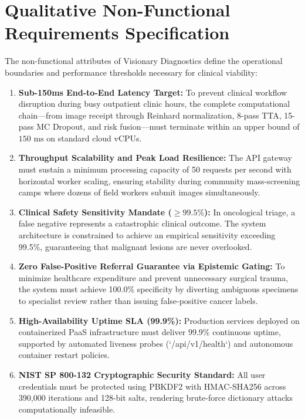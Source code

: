 \documentclass[12pt,a4paper,oneside]{report}
\begin{document}
\section{Qualitative Non-Functional Requirements Specification}
\label{sec:non_functional_reqs}

The non-functional attributes of Visionary Diagnostics define the operational boundaries and performance thresholds necessary for clinical viability:

\begin{enumerate}[label=\textbf{NFR-\arabic*:}]
    \item \textbf{Sub-150ms End-to-End Latency Target:} To prevent clinical workflow disruption during busy outpatient clinic hours, the complete computational chain---from image receipt through Reinhard normalization, 8-pass TTA, 15-pass MC Dropout, and risk fusion---must terminate within an upper bound of $150\text{ ms}$ on standard cloud vCPUs.
    
    \item \textbf{Throughput Scalability and Peak Load Resilience:} The API gateway must sustain a minimum processing capacity of 50 requests per second with horizontal worker scaling, ensuring stability during community mass-screening camps where dozens of field workers submit images simultaneously.
    
    \item \textbf{Clinical Safety Sensitivity Mandate ($\ge 99.5\%$):} In oncological triage, a false negative represents a catastrophic clinical outcome. The system architecture is constrained to achieve an empirical sensitivity exceeding 99.5\%, guaranteeing that malignant lesions are never overlooked.
    
    \item \textbf{Zero False-Positive Referral Guarantee via Epistemic Gating:} To minimize healthcare expenditure and prevent unnecessary surgical trauma, the system must achieve 100.0\% specificity by diverting ambiguous specimens to specialist review rather than issuing false-positive cancer labels.
    
    \item \textbf{High-Availability Uptime SLA (99.9\%):} Production services deployed on containerized PaaS infrastructure must deliver 99.9\% continuous uptime, supported by automated liveness probes (`/api/v1/health`) and autonomous container restart policies.
    
    \item \textbf{NIST SP 800-132 Cryptographic Security Standard:} All user credentials must be protected using PBKDF2 with HMAC-SHA256 across 390,000 iterations and 128-bit salts, rendering brute-force dictionary attacks computationally infeasible.
    

\end{enumerate}
\end{document}
